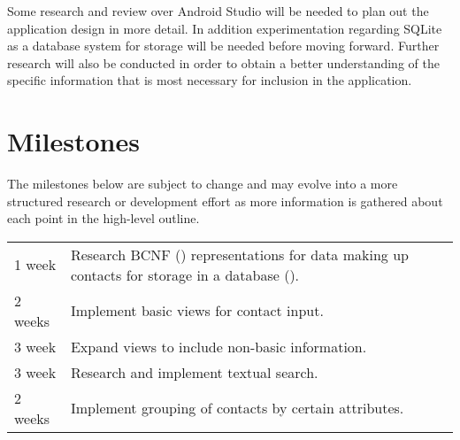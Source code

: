 \documentclass[man, 11pt, a4paper, biblatex]{apa6}
\begin{document}
  Some research and review over Android Studio will be needed to plan out the application design in more detail. In addition experimentation regarding SQLite as a database system for storage will be needed before moving forward. Further research will also be conducted in order to obtain a better understanding of the specific information that is most necessary for inclusion in the application.


  \section{Milestones}

  The milestones below are subject to change and may evolve into a more structured research or development effort as more information is gathered about each point in the high-level outline.

  \begin{tabular}{l|p{4in}}
    1 week & Research BCNF (\cite{bcnf}) representations for data making up contacts for storage in a database (\cite{sqlite}).\\
    2 weeks & Implement basic views for contact input.\\
    3 week & Expand views to include non-basic information.\\
    3 week & Research and implement textual search.\\
    2 weeks & Implement grouping of contacts by certain attributes.\\
  \end{tabular}

  \nocite{*}\printbibliography
\end{document}
